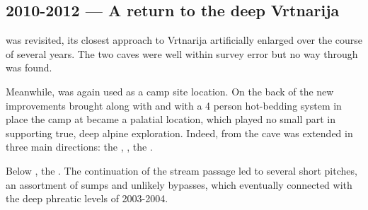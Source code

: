 \subsection{2010-2012 --- A return to the deep Vrtnarija} 
 was revisited, its closest approach to Vrtnarija artificially enlarged over the course of several years. The two caves were well within survey error but no way through was found. 

Meanwhile,  was again used as a camp site location. On the back of the new improvements brought along with  and with a 4 person hot-bedding system in place the camp at  became a palatial location, which played no small part in supporting true, deep alpine exploration. Indeed, from  the cave was extended in three main directions: the , , the .

Below , the . The continuation of the stream passage led to several short pitches, an assortment of sumps and unlikely bypasses, which eventually connected with the deep phreatic levels of 2003-2004.

